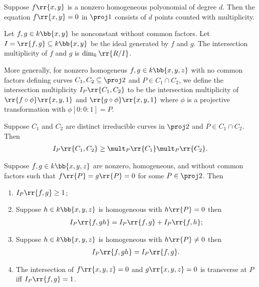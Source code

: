 \documentclass{article}
\begin{document}
\begin{theorem}
  Suppose $f\rr{x,y}$ is a nonzero homogeneous polyonomial of degree $d$. Then the equation
  $f\rr{x,y}=0$ in $\proj 1$ consists of $d$ points counted with multiplicity.
\end{theorem}

\begin{definition}
  Let $f,g\in k\bb{x,y}$ be nonconstant without common factors. Let
  $I=\rr{f,g}\subseteq k\bb{x,y}$ be the ideal generated by $f$ and $g$. The intersection
  multiplicity of $f$ and $g$ is $\dim_k\rr{R/I}$.

  More generally, for nonzero homogeneus $f,g\in k\bb{x,y,z}$ with no common factors
  defining curves $C_1,C_2\subseteq\proj 2$ and $P\in C_1\cap C_2$, we define the
  intersection multiplicity $I_P\rr{C_1,C_2}$ to be the intersection multiplicity of
  $\rr{f\circ\phi}\rr{x,y,1}$ and $\rr{g\circ\phi}\rr{x,y,1}$ where $\phi$ is a projective
  transformation with $\phi[0:0:1]=P$.
\end{definition}

\begin{proposition}
  Suppose $C_1$ and $C_2$ are distinct irreducible curves in $\proj 2$ and $P\in C_1\cap C_2$.
  Then
  \begin{align*}
    I_P\rr{C_1,C_2}\geq\mult_P\rr{C_1}\mult_P\rr{C_2}.
  \end{align*}
\end{proposition}

\begin{proposition}
  Suppose $f,g\in k\bb{x,y,z}$ are nonzero, homogeneous, and without common factors such that
  $f\rr{P}=g\rr{P}=0$ for some $P\in\proj 2$. Then
  \begin{enumerate}
    \item $I_P\rr{f,g}\geq 1$;
    \item Suppose $h\in k\bb{x,y,z}$ is homogeneous with $h\rr{P}=0$ then
      \begin{align*}
        I_P\rr{f,gh}=I_P\rr{f,g}+I_P\rr{f,h};
      \end{align*}
    \item Suppose $h\in k\bb{x,y,z}$ is homogeneous with $h\rr{P}\neq 0$ then
      \begin{align*}
        I_P\rr{f,gh}=I_P\rr{f,g}.
      \end{align*}
    \item The intersection of $f\rr{x,y,z}=0$ and $g\rr{x,y,z}=0$ is transverse at $P$ iff
      $I_P\rr{f,g}=1$.
  \end{enumerate}
\end{proposition}
\end{document}
